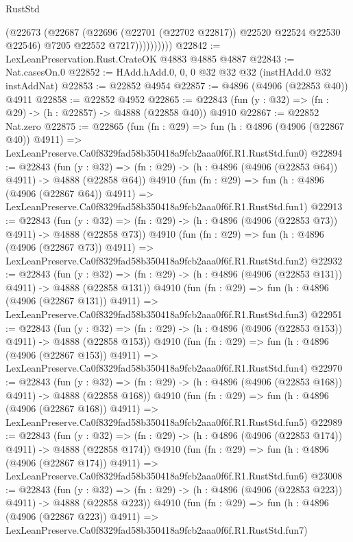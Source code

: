 \begin{lexlean}{RustStd}
\begin{coremodule}
                    (@22673
                      (@22687
                        (@22696 (@22701 (@22702 @22817)) @22520 @22524 @22530 @22546)
                        @7205
                        @22552
                        @7217))))))))))
@22842 := LexLeanPreservation.Rust.CrateOK @4883 @4885 @4887
@22843 := Nat.casesOn.{0}
@22852 := HAdd.hAdd.{0, 0, 0} @32 @32 @32 (instHAdd.{0} @32 instAddNat)
@22853 := @22852 @4954
@22857 := @4896 (@4906 (@22853 @40)) @4911
@22858 := @22852 @4952
@22865 := @22843 (fun (y : @32) => (fn : @29) -> (h : @22857) -> @4888 (@22858 @40)) @4910
@22867 := @22852 Nat.zero
@22875 := @22865
    (fun (fn : @29) =>
    fun (h : @4896 (@4906 (@22867 @40)) @4911) =>
    LexLeanPreserve.Ca0f8329fad58b350418a9fcb2aaa0f6f.R1.RustStd.fun0)
@22894 := @22843
    (fun (y : @32) => (fn : @29) -> (h : @4896 (@4906 (@22853 @64)) @4911) -> @4888 (@22858 @64))
    @4910
    (fun (fn : @29) =>
    fun (h : @4896 (@4906 (@22867 @64)) @4911) =>
    LexLeanPreserve.Ca0f8329fad58b350418a9fcb2aaa0f6f.R1.RustStd.fun1)
@22913 := @22843
    (fun (y : @32) => (fn : @29) -> (h : @4896 (@4906 (@22853 @73)) @4911) -> @4888 (@22858 @73))
    @4910
    (fun (fn : @29) =>
    fun (h : @4896 (@4906 (@22867 @73)) @4911) =>
    LexLeanPreserve.Ca0f8329fad58b350418a9fcb2aaa0f6f.R1.RustStd.fun2)
@22932 := @22843
    (fun (y : @32) => (fn : @29) -> (h : @4896 (@4906 (@22853 @131)) @4911) -> @4888 (@22858 @131))
    @4910
    (fun (fn : @29) =>
    fun (h : @4896 (@4906 (@22867 @131)) @4911) =>
    LexLeanPreserve.Ca0f8329fad58b350418a9fcb2aaa0f6f.R1.RustStd.fun3)
@22951 := @22843
    (fun (y : @32) => (fn : @29) -> (h : @4896 (@4906 (@22853 @153)) @4911) -> @4888 (@22858 @153))
    @4910
    (fun (fn : @29) =>
    fun (h : @4896 (@4906 (@22867 @153)) @4911) =>
    LexLeanPreserve.Ca0f8329fad58b350418a9fcb2aaa0f6f.R1.RustStd.fun4)
@22970 := @22843
    (fun (y : @32) => (fn : @29) -> (h : @4896 (@4906 (@22853 @168)) @4911) -> @4888 (@22858 @168))
    @4910
    (fun (fn : @29) =>
    fun (h : @4896 (@4906 (@22867 @168)) @4911) =>
    LexLeanPreserve.Ca0f8329fad58b350418a9fcb2aaa0f6f.R1.RustStd.fun5)
@22989 := @22843
    (fun (y : @32) => (fn : @29) -> (h : @4896 (@4906 (@22853 @174)) @4911) -> @4888 (@22858 @174))
    @4910
    (fun (fn : @29) =>
    fun (h : @4896 (@4906 (@22867 @174)) @4911) =>
    LexLeanPreserve.Ca0f8329fad58b350418a9fcb2aaa0f6f.R1.RustStd.fun6)
@23008 := @22843
    (fun (y : @32) => (fn : @29) -> (h : @4896 (@4906 (@22853 @223)) @4911) -> @4888 (@22858 @223))
    @4910
    (fun (fn : @29) =>
    fun (h : @4896 (@4906 (@22867 @223)) @4911) =>
    LexLeanPreserve.Ca0f8329fad58b350418a9fcb2aaa0f6f.R1.RustStd.fun7)

\end{coremodule}
\end{lexlean}

